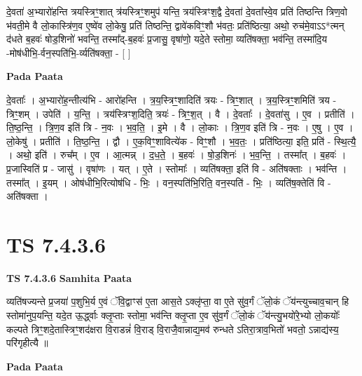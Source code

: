 \documentclass[17pt]{extarticle}
\begin{document}
दे॒वता॑ अ॒भ्यारो॑हन्ति त्रयस्त्रिꣳ॒॒शात् त्र॑यस्त्रिꣳ॒॒शमुप॑ यन्ति॒ त्रय॑स्त्रिꣳश॒द्वै दे॒वता॑ दे॒वता᳚स्वे॒व प्रति॑ तिष्ठन्ति त्रिण॒वो भ॑वती॒मे वै लो॒कास्त्रि॑ण॒व ए॒ष्वे॑व लो॒केषु॒ प्रति॑ तिष्ठन्ति॒ द्वावे॑कविꣳ॒॒शौ भ॑वतः॒ प्रति॑ष्ठित्या॒ अथो॒ रुच॑मे॒वाऽऽ*त्मन् द॑धते ब॒हवः॑ षोड॒शिनो॑ भवन्ति॒ तस्मा᳚द्-ब॒हवः॑ प्र॒जासु॒ वृषा॑णो॒ यदे॒ते स्तोमा॒ व्यति॑षक्ता॒ भव॑न्ति॒ तस्मा॑दि॒य -मोष॑धीभि॒-र्वन॒स्पति॑भि॒-र्व्यति॑षक्ता॒ - [  ] \newline

\textbf{Pada Paata} \newline

दे॒वताः᳚ । अ॒भ्यारो॑ह॒न्तीत्य॑भि - आरो॑हन्ति । त्र॒य॒स्त्रिꣳ॒॒शादिति॑ त्रयः - त्रिꣳ॒॒शात् । त्र॒य॒स्त्रिꣳ॒॒शमिति॑ त्रय - त्रिꣳ॒॒शम् । उपेति॑ । य॒न्ति॒ । त्रय॑स्त्रिꣳश॒दिति॒ त्रयः॑ - त्रिꣳ॒॒श॒त् । वै । दे॒वताः᳚ । दे॒वता॑सु । ए॒व । प्रतीति॑ । ति॒ष्ठ॒न्ति॒ । त्रि॒ण॒व इति॑ त्रि - न॒वः । भ॒व॒ति॒ । इ॒मे । वै । लो॒काः । त्रि॒ण॒व इति॑ त्रि - न॒वः । ए॒षु । ए॒व । लो॒केषु॑ । प्रतीति॑ । ति॒ष्ठ॒न्ति॒ । द्वौ । ए॒क॒विꣳ॒॒शावित्ये॑क - विꣳ॒॒शौ । भ॒व॒तः॒ । प्रति॑ष्ठित्या॒ इति॒ प्रति॑ - स्थि॒त्यै॒ । अथो॒ इति॑ । रुच᳚म् । ए॒व । आ॒त्मन्न् । द॒ध॒ते॒ । ब॒हवः॑ । षो॒ड॒शिनः॑ । भ॒व॒न्ति॒ । तस्मा᳚त् । ब॒हवः॑ । प्र॒जास्विति॑ प्र - जासु॑ । वृषा॑णः । यत् । ए॒ते । स्तोमाः᳚ । व्यति॑षक्ता॒ इति॑ वि - अति॑षक्ताः । भव॑न्ति । तस्मा᳚त् । इ॒यम् । ओष॑धीभि॒रित्योष॑धि - भिः॒ । वन॒स्पति॑भि॒रिति॒ वन॒स्पति॑ - भिः॒ । व्यति॑ष॒क्तेति॑ वि - अति॑षक्ता ।  \newline




\section*{ TS 7.4.3.6 }

\textbf{TS 7.4.3.6 } \newline
\textbf{Samhita Paata} \newline

व्यति॑षज्यन्ते प्र॒जया॑ प॒शुभि॒र्य ए॒वं ॅवि॒द्वाꣳस॑ ए॒ता आस॒ते ऽक्लृ॑प्ता॒ वा ए॒ते सु॑व॒र्गं ॅलो॒कं ॅय॑न्त्युच्चाव॒चान् हि स्तोमा॑नुप॒यन्ति॒ यदे॒त ऊ॒र्द्ध्वाः क्लृ॒प्ताः स्तोमा॒ भव॑न्ति क्लृ॒प्ता ए॒व सु॑व॒र्गं ॅलो॒कं ॅय॑न्त्यु॒भयो॑रे॒भ्यो लो॒कयोः᳚ कल्पते त्रिꣳ॒॒शदे॒तास्त्रिꣳ॒॒शद॑क्षरा वि॒राडन्नं॑ वि॒राड् वि॒राजै॒वान्नाद्य॒मव॑ रुन्धते ऽतिरा॒त्राव॒भितो॑ भवतो॒ ऽन्नाद्य॑स्य॒ परि॑गृहीत्यै ॥ \newline

\textbf{Pada Paata} \newline
\end{document}
